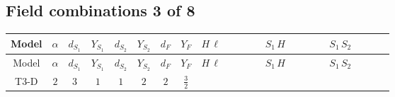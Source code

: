 \documentclass[8pt]{article}
\begin{document}
\begin{landscape}
\subsection*{Field combinations 3 of 8}
\begin{longtable}{@{}cccccccc >{\raggedright\arraybackslash}p{0.21\linewidth} >{\raggedright\arraybackslash}p{0.21\linewidth} >{\raggedright\arraybackslash}p{0.21\linewidth}@{}}
\toprule
Model & $\alpha$ & $d_{S_1}$ & $Y_{S_1}$ & $d_{S_2}$ & $Y_{S_2}$ & $d_F$ & $Y_F$ & $H\,\ell$ & $S_1\,H$ & $S_1\,S_2$ \\
\midrule
\endfirsthead
\toprule
Model & $\alpha$ & $d_{S_1}$ & $Y_{S_1}$ & $d_{S_2}$ & $Y_{S_2}$ & $d_F$ & $Y_F$ & $H\,\ell$ & $S_1\,H$ & $S_1\,S_2$ \\
\midrule
\endhead
T3-D & $2$ & $3$ & $1$ & $1$ & $2$ & $2$ & $\frac{3}{2}$ & \scriptsize\adjustbox{max width=\linewidth}{$\begin{gathered} +\frac{2 \hbar  \overline{y_{1,i_1,r_1}} \overline{y_{2,i_2,r_1}} L_{a_4,i_2}{}^T\, C\, P_L\, L_{a_2,i_1} H_{a_1} H_{a_3} \lambda_5 \epsilon_{a_1,a_2} \epsilon_{a_3,a_4}}{\sqrt{3} \epsilon  M_F} \\ +\frac{2 \hbar  \overline{y_{1,i_1,r_1}} \overline{y_{2,i_2,r_1}} L_{a_4,i_2}{}^T\, C\, P_L\, L_{a_2,i_1} H_{a_1} H_{a_3} \lambda_5 \epsilon_{a_1,a_2} \epsilon_{a_3,a_4}}{\sqrt{3} M_F} \\ +\frac{2 \hbar  \overline{\lambda_5} \overline{L_{a_3,i_1}}\, C\, P_R\, \overline{L_{a_4,i_2}}{}^T y_{1,i_1,r_1} y_{2,i_2,r_1} \epsilon_{a_1,a_3} \epsilon_{a_2,a_4} H_{a_1}{}^{\dagger } H_{a_2}{}^{\dagger }}{\sqrt{3} \epsilon  M_F}\end{gathered}$} & \scriptsize\adjustbox{max width=\linewidth}{$\begin{gathered} -\frac{2 \hbar  \overline{y_{1,i_1,r_1}} \overline{Y_{e,i_2,i_3}} H_{a_1} S_{1,j_1} y_{1,i_2,r_1} Y_{e,i_1,i_3} H_{a_1}{}^{\dagger } S_{1,j_1}{}^{\dagger }}{\sqrt{3} \epsilon } \\ -\frac{2 \hbar  \overline{y_{1,i_1,r_1}} \overline{Y_{e,i_2,i_3}} H_{a_1} S_{1,j_1} y_{1,i_2,r_1} Y_{e,i_1,i_3} H_{a_1}{}^{\dagger } S_{1,j_1}{}^{\dagger }}{\sqrt{3}} \\ +\frac{2 i \sqrt{\frac{2}{3}} \hbar  \overline{y_{1,i_1,r_1}} \overline{Y_{e,i_2,i_3}} H_{a_2} S_{1,j_2} y_{1,i_2,r_1} Y_{e,i_1,i_3} H_{a_1}{}^{\dagger } S_{1,j_1}{}^{\dagger } \mathcal{I}_{H1,a_1,a_2,j_1,j_2}{}^1}{\epsilon }\end{gathered}$} & \scriptsize\adjustbox{max width=\linewidth}{$\begin{gathered} -\frac{4 \hbar  \overline{y_{1,i_1,r_1}} \overline{y_{2,i_2,r_2}} S_2 S_{1,j_1} y_{1,i_2,r_1} y_{2,i_1,r_2} S_2{}^{\dagger } S_{1,j_1}{}^{\dagger }}{\sqrt{3} \epsilon } \\ +\frac{4 \hbar  \overline{y_{1,i_1,r_1}} \overline{y_{2,i_2,r_1}} S_2 S_{1,j_1} y_{1,i_2,r_2} y_{2,i_1,r_2} S_2{}^{\dagger } S_{1,j_1}{}^{\dagger }}{\sqrt{3}} \\ +\frac{4 \hbar  \overline{y_{1,i_1,r_1}} \overline{y_{2,i_2,r_1}} S_2 S_{1,j_1} y_{1,i_1,r_2} y_{2,i_2,r_2} S_2{}^{\dagger } S_{1,j_1}{}^{\dagger }}{\sqrt{3}}\end{gathered}$} \\

\end{longtable}
\end{landscape}
\end{document}
